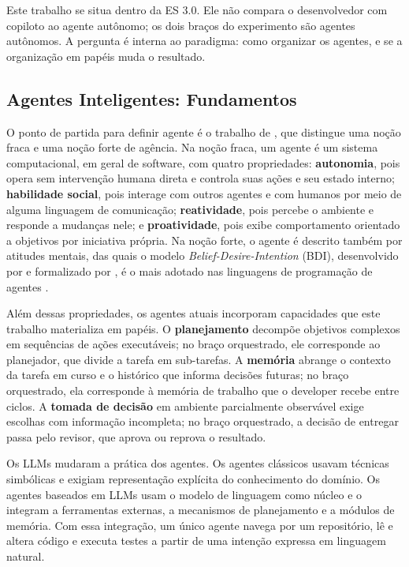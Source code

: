 Este trabalho se situa dentro da ES 3.0. Ele não compara o desenvolvedor com copiloto ao agente autônomo; os dois braços do experimento são agentes autônomos. A pergunta é interna ao paradigma: como organizar os agentes, e se a organização em papéis muda o resultado.

\subsection{Agentes Inteligentes: Fundamentos}
\label{ssec:agentes}

O ponto de partida para definir agente é o trabalho de \cite{IntelligentAgents1995}, que distingue uma noção fraca e uma noção forte de agência. Na noção fraca, um agente é um sistema computacional, em geral de software, com quatro propriedades: \textbf{autonomia}, pois opera sem intervenção humana direta e controla suas ações e seu estado interno; \textbf{habilidade social}, pois interage com outros agentes e com humanos por meio de alguma linguagem de comunicação; \textbf{reatividade}, pois percebe o ambiente e responde a mudanças nele; e \textbf{proatividade}, pois exibe comportamento orientado a objetivos por iniciativa própria. Na noção forte, o agente é descrito também por atitudes mentais, das quais o modelo \textit{Belief-Desire-Intention} (BDI), desenvolvido por \cite{Intention1987} e formalizado por \cite{BDIAgents1995}, é o mais adotado nas linguagens de programação de agentes \citep{ReviewMAS2021}.

Além dessas propriedades, os agentes atuais incorporam capacidades que este trabalho materializa em papéis. O \textbf{planejamento} decompõe objetivos complexos em sequências de ações executáveis; no braço orquestrado, ele corresponde ao planejador, que divide a tarefa em sub-tarefas. A \textbf{memória} abrange o contexto da tarefa em curso e o histórico que informa decisões futuras; no braço orquestrado, ela corresponde à memória de trabalho que o developer recebe entre ciclos. A \textbf{tomada de decisão} em ambiente parcialmente observável exige escolhas com informação incompleta; no braço orquestrado, a decisão de entregar passa pelo revisor, que aprova ou reprova o resultado.

Os LLMs mudaram a prática dos agentes. Os agentes clássicos usavam técnicas simbólicas e exigiam representação explícita do conhecimento do domínio. Os agentes baseados em LLMs usam o modelo de linguagem como núcleo e o integram a ferramentas externas, a mecanismos de planejamento e a módulos de memória. Com essa integração, um único agente navega por um repositório, lê e altera código e executa testes a partir de uma intenção expressa em linguagem natural.

